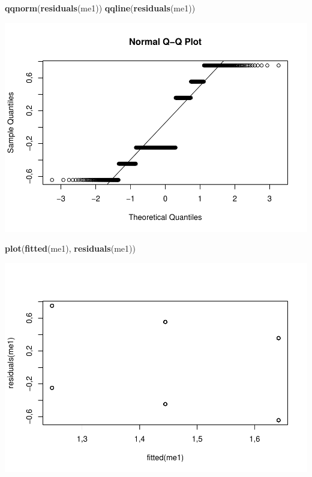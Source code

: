 \documentclass[]{article}
\newenvironment{Shaded}{\begin{snugshade}}{\end{snugshade}}
\newcommand{\KeywordTok}[1]{\textcolor[rgb]{0.13,0.29,0.53}{\textbf{#1}}}
\newcommand{\NormalTok}[1]{#1}
\begin{document}
\begin{Shaded}
\begin{Highlighting}[]
\KeywordTok{qqnorm}\NormalTok{(}\KeywordTok{residuals}\NormalTok{(me1))}
\KeywordTok{qqline}\NormalTok{(}\KeywordTok{residuals}\NormalTok{(me1))}
\end{Highlighting}
\end{Shaded}

\includegraphics{titanicDataClean_files/figure-latex/unnamed-chunk-25-1.pdf}

\begin{Shaded}
\begin{Highlighting}[]
\KeywordTok{plot}\NormalTok{(}\KeywordTok{fitted}\NormalTok{(me1), }\KeywordTok{residuals}\NormalTok{(me1))}
\end{Highlighting}
\end{Shaded}

\includegraphics{titanicDataClean_files/figure-latex/unnamed-chunk-25-2.pdf}
\end{document}
